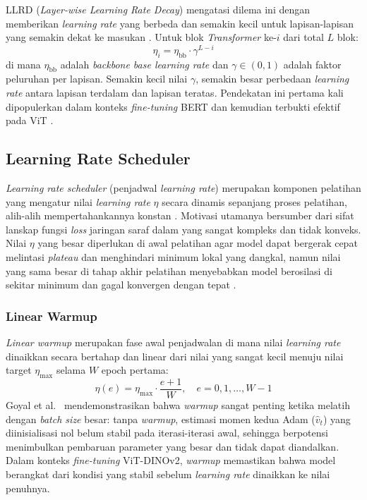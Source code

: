 LLRD (\textit{Layer-wise Learning Rate Decay}) mengatasi dilema ini dengan memberikan \textit{learning rate} yang berbeda dan semakin kecil untuk lapisan-lapisan yang semakin dekat ke masukan \cite{sun2019bert}. Untuk blok \textit{Transformer} ke-$i$ dari total $L$ blok:
\begin{equation}
    \eta_i = \eta_{\text{bb}} \cdot \gamma^{L - i}
\end{equation}
di mana $\eta_{\text{bb}}$ adalah \textit{backbone base learning rate} dan $\gamma \in (0, 1)$ adalah faktor peluruhan per lapisan. Semakin kecil nilai $\gamma$, semakin besar perbedaan \textit{learning rate} antara lapisan terdalam dan lapisan teratas. Pendekatan ini pertama kali dipopulerkan dalam konteks \textit{fine-tuning} BERT \cite{sun2019bert} dan kemudian terbukti efektif pada ViT \cite{dosovitskiy2021image}.

\subsection{Learning Rate Scheduler}
\textit{Learning rate scheduler} (penjadwal \textit{learning rate}) merupakan komponen pelatihan yang mengatur nilai \textit{learning rate} $\eta$ secara dinamis sepanjang proses pelatihan, alih-alih mempertahankannya konstan \cite{loshchilov2017sgdr}. Motivasi utamanya bersumber dari sifat lanskap fungsi \textit{loss} jaringan saraf dalam yang sangat kompleks dan tidak konveks. Nilai $\eta$ yang besar diperlukan di awal pelatihan agar model dapat bergerak cepat melintasi \textit{plateau} dan menghindari minimum lokal yang dangkal, namun nilai yang sama besar di tahap akhir pelatihan menyebabkan model berosilasi di sekitar minimum dan gagal konvergen dengan tepat \cite{goyal2017accurate}. %
 
\subsubsection{Linear Warmup}
 
\textit{Linear warmup} merupakan fase awal penjadwalan di mana nilai \textit{learning rate} dinaikkan secara bertahap dan linear dari nilai yang sangat kecil menuju nilai target $\eta_{\max}$ selama $W$ epoch pertama:
\begin{equation}
    \eta(e) = \eta_{\max} \cdot \frac{e + 1}{W},
    \quad e = 0, 1, \ldots, W-1
\end{equation}
Goyal et al.\ \cite{goyal2017accurate} mendemonstrasikan bahwa \textit{warmup} sangat penting ketika melatih dengan \textit{batch size} besar: tanpa \textit{warmup}, estimasi momen kedua Adam ($\hat{v}_t$) yang diinisialisasi nol belum stabil pada iterasi-iterasi awal, sehingga berpotensi menimbulkan pembaruan parameter yang besar dan tidak dapat diandalkan. Dalam konteks \textit{fine-tuning} ViT-DINOv2, \textit{warmup} memastikan bahwa model berangkat dari kondisi yang stabil sebelum \textit{learning rate} dinaikkan ke nilai penuhnya.
 
